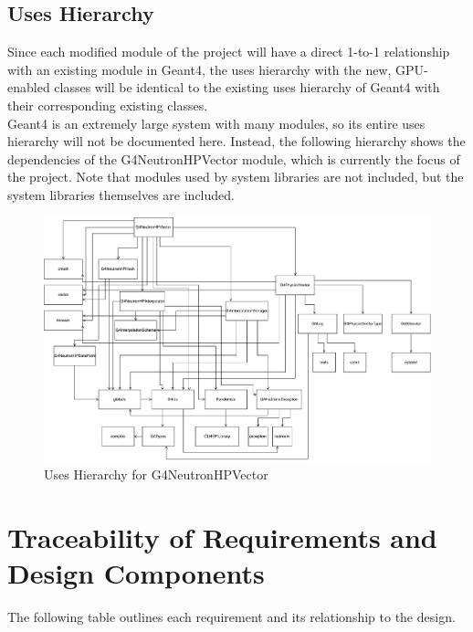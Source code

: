 \documentclass[12pt]{article}
\begin{document}
\subsection{Uses Hierarchy}
Since each modified module of the project will have a direct 1-to-1 relationship with an existing module in Geant4, the uses hierarchy with the new, GPU-enabled classes will be identical to the existing uses hierarchy of Geant4 with their corresponding existing classes.\\

Geant4 is an extremely large system with many modules, so its entire uses hierarchy will not be documented here. Instead, the following hierarchy shows the dependencies of the G4NeutronHPVector module, which is currently the focus of the project. Note that modules used by system libraries are not included, but the system libraries themselves are included.
\begin{figure}[h]
\caption{Uses Hierarchy for G4NeutronHPVector}\label{imgUsesHierarchy}
\includegraphics[width=\textwidth]{uses_hierarchy.pdf}
\end{figure}
\clearpage
\section{Traceability of Requirements and Design Components}%
The following table outlines each requirement and its relationship to the design.
\end{document}
